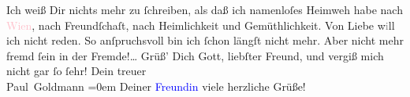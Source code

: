            \pstart
           Ich weiß Dir nichts mehr zu ſchreiben, als daß ich namenloſes Heimweh habe nach \textcolor{pink}{Wien}{}\ledrightnote{\textcolor{pink}{Wien}}, nach Freundſchaſt, nach Heimlichkeit und
               Gemüthlichkeit. Von Liebe w\textcolor{gray}{i}ll ich nicht reden. So anſpruchsvoll
               bin ich ſchon längſt nicht mehr. Aber nicht mehr fremd ſein in der Fremde!{\dots}\pend
           \pstart
           Grüß’ Dich Gott, liebſter Freund, und vergiß mich nicht gar ſo ſehr!\pend
           \pstart
           Dein treuer {\\[\baselineskip]}\spacefill\mbox{Paul Goldmann}\pend
           \leftskip=0em{}\pstart
           \noindent{}Deiner \textcolor{blue}{Freundin}{} viele
                  herzliche Grüße!\pend
           \endnumbering{}  
      